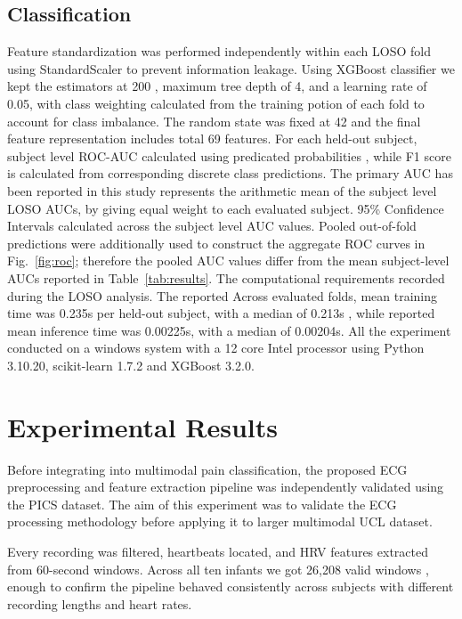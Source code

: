 \documentclass[conference]{IEEEtran}
\begin{document}
\subsection{Classification}
Feature standardization was performed independently within each LOSO fold using StandardScaler to prevent information leakage. Using XGBoost classifier we kept the estimators at 200 , maximum tree depth of 4, and a learning rate of 0.05, with class weighting calculated from the training potion of each fold to account for class imbalance. The random state was fixed at 42 and the final feature representation includes total 69 features. 
For each held-out subject, subject level ROC-AUC calculated using predicated probabilities , while F1 score is calculated from corresponding discrete class predictions. The primary AUC has been reported in this study represents the arithmetic mean of the subject level LOSO AUCs, by giving equal weight to each evaluated subject. 95\% Confidence Intervals calculated across the subject level AUC values. Pooled out-of-fold predictions were additionally used to construct the aggregate ROC curves in Fig.~\ref{fig:roc}; therefore the pooled AUC values differ from the mean subject-level AUCs reported in Table~\ref{tab:results}.
The computational requirements recorded during the LOSO analysis. The reported Across evaluated folds, mean training time was 0.235s per held-out subject, with a median of 0.213s , while reported mean inference time was 0.00225s, with a median of 0.00204s.
All the experiment conducted on a windows system with a 12 core Intel processor using Python 3.10.20, scikit-learn 1.7.2 and XGBoost 3.2.0.

\section{Experimental Results}

Before integrating into multimodal pain classification, the proposed ECG preprocessing and feature extraction pipeline was independently validated using the PICS dataset. The aim of this experiment was to validate the ECG processing methodology before applying it to larger multimodal UCL dataset.

Every recording was filtered, heartbeats located, and HRV features extracted from 60-second windows. Across all ten infants we got 26,208 valid windows , enough to confirm the pipeline behaved consistently across subjects with different recording lengths and heart rates.
\end{document}
